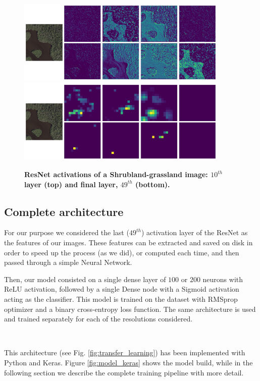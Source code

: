 \begin{figure}[h!]
	\centering
	\includegraphics[width=0.9\textwidth]{Figures/activations/shrubland-grassland_l0_s1_activation_10.png}
	\includegraphics[width=0.9\textwidth]{Figures/activations/shrubland-grassland_l0_s1_activation_49.png}
	\captionsetup{width=1\linewidth}
	\caption{\textbf{ResNet activations of a Shrubland-grassland image: $10^{th}$ layer (top) and final layer, $49^{th}$ (bottom).}}
	\label{fig:act_shrubland_grassland}
\end{figure}


\subsection{Complete architecture}

For our purpose we considered the last ($49^{th}$) activation layer of the ResNet as the features of our images. These features can be extracted and saved on disk in order to speed up the process (as we did), or computed each time, and then passed through a simple Neural Network.

Then, our model consisted on a single dense layer of $100$ or $200$ neurons with ReLU activation, followed by a single Dense node with a Sigmoid activation acting as the classifier. This model is trained on the dataset with RMSprop optimizer \parencite{ruder2016} and a binary cross-entropy loss function. The same architecture is used and trained separately for each of the resolutions considered. 

\

This architecture (see Fig. \ref{fig:transfer_learning}) has been implemented with Python and Keras. Figure \ref{fig:model_keras} shows the model build, while in the following section we describe the complete training pipeline with more detail.

